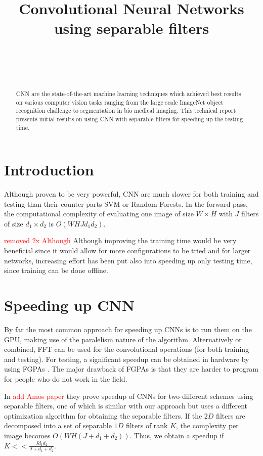 \documentclass{article} %
\title{Convolutional Neural Networks using separable filters}
\author{
\fontsize{8}{8}\selectfont{Petrescu Viviana}\\
\fontsize{8}{8}\selectfont{EPFL} \\
\fontsize{8}{8}\selectfont{\texttt{viviana.petrescu@epfl.ch}} \\
}
\begin{document}
\maketitle

\begin{abstract}
CNN are the state-of-the-art machine learning techniques which achieved best results on various computer vision tasks ranging from the large scale ImageNet object recognition challenge to segmentation in bio medical imaging.
This technical report presents initial results on using CNN with separable filters for speeding up the testing time.
\end{abstract}

\section{Introduction}
Although proven to be very powerful, CNN are much slower for both training and testing than their counter parts SVM or Random Forests.
In the forward pass, the computational complexity of evaluating one image of size $W\times H$ with $J$ filters of size $d_{1}\times d_{2}$ is $O(WHJd_{1}d_{2})$.
 
\textcolor{red}{removed 2x Although}
 Although improving the training time would be very beneficial since it would allow for more configurations to be tried and for larger networks, increasing effort has been put also into speeding up only testing time, since training can be done offline.

\section{Speeding up CNN}
By far the most common approach for speeding up CNNs is to run them on the GPU, making use of the paralelism nature of the algorithm. Alternatively or combined, FFT can be used for the convolutional operations (for  both training and testing)\cite{DBLP:journals/corr/MathieuHL13}.  For testing, a significant speedup can be obtained in hardware by using FGPAs \citep{lecun2010convolutional}. The major drawback of FGPAs is that they are harder to program for people who do not work in the field.

 In \textcolor{red}{add Amos paper} \citep{Jaderberg14b} they prove speedup of CNNs for two different schemes using separable filters, one of which is similar with our approach but uses a different optimization algorithm for obtaining the separable filters. 
  If the $2D$ filters are decomposed into a set of separable $1D$ filters of rank $K$, the complexity per image becomes
 $O(WH(J +d_{1}+d_{2}))$. Thus, we obtain a speedup if $K<< \frac{Jd_{1}d_{2}}{J +d_{1}+d_{2}}$. 
\end{document}
